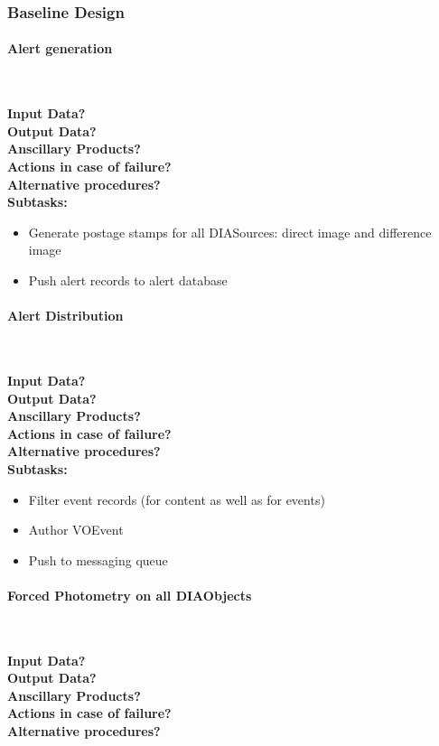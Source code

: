 \subsubsection{Baseline Design}

\paragraph{Alert generation}~

\noindent
{\bf Input Data?}\\
{\bf Output Data?}\\
{\bf Anscillary Products?}\\
{\bf Actions in case of failure?}\\
{\bf Alternative procedures?}\\

\noindent
{\bf Subtasks:}
\begin{itemize}
\item Generate postage stamps for all DIASources: direct image and difference image
\item Push alert records to alert database
\end{itemize}

\paragraph{Alert Distribution}~

\noindent
{\bf Input Data?}\\
{\bf Output Data?}\\
{\bf Anscillary Products?}\\
{\bf Actions in case of failure?}\\
{\bf Alternative procedures?}\\

\noindent
{\bf Subtasks:}
\begin{itemize}
\item Filter event records (for content as well as for events)
\item Author VOEvent
\item Push to messaging queue
\end{itemize}

\paragraph{Forced Photometry on all DIAObjects}~

\noindent
{\bf Input Data?}\\
{\bf Output Data?}\\
{\bf Anscillary Products?}\\
{\bf Actions in case of failure?}\\
{\bf Alternative procedures?}\\

